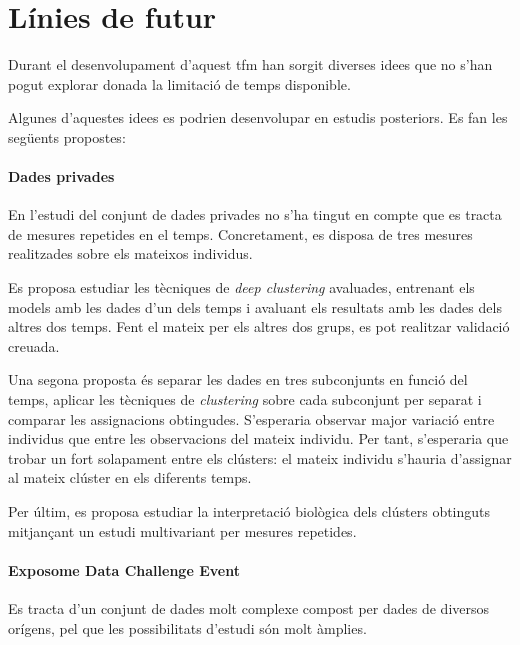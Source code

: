 \documentclass[CAT,BIB]{TFUOC}%
\begin{document}
    \section{Línies de futur}
    \label{s:futur}

        Durant el desenvolupament d'aquest \gls{tfm}
        han sorgit diverses idees que no s'han pogut explorar
        donada la limitació de temps disponible.

        Algunes d'aquestes idees es podrien desenvolupar
        en estudis posteriors.
        Es fan les següents propostes:

        \paragraph{Dades \gls{privades}}
            En l'estudi del conjunt de dades \gls{privades}
            no s'ha tingut en compte que es tracta de mesures repetides en el temps.
            Concretament,
            es disposa de tres mesures realitzades sobre els mateixos individus.

            Es proposa estudiar les tècniques de \textit{deep clustering} avaluades,
            entrenant els models amb les dades d'un dels temps
            i avaluant els resultats amb les dades dels altres dos temps.
            Fent el mateix per els altres dos grups,
            es pot realitzar validació creuada.

            Una segona proposta és separar les dades en tres subconjunts en funció del temps,
            aplicar les tècniques de \textit{clustering} sobre cada subconjunt per separat
            i comparar les assignacions obtingudes.
            S'esperaria observar major variació entre individus
            que entre les observacions del mateix individu.
            Per tant, s'esperaria que trobar un fort solapament entre els clústers:
            el mateix individu s'hauria d'assignar al mateix clúster en els diferents temps.

            Per últim,
            es proposa estudiar la interpretació biològica dels clústers obtinguts
            mitjançant un estudi multivariant per mesures repetides.

        \paragraph{Exposome Data Challenge Event}
            Es tracta d'un conjunt de dades molt complexe
            compost per dades de diversos orígens,
            pel que les possibilitats d'estudi són molt àmplies.
\end{document}
